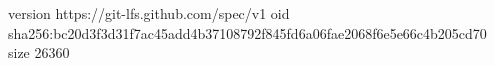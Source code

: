 version https://git-lfs.github.com/spec/v1
oid sha256:bc20d3f3d31f7ac45add4b37108792f845fd6a06fae2068f6e5e66c4b205cd70
size 26360
